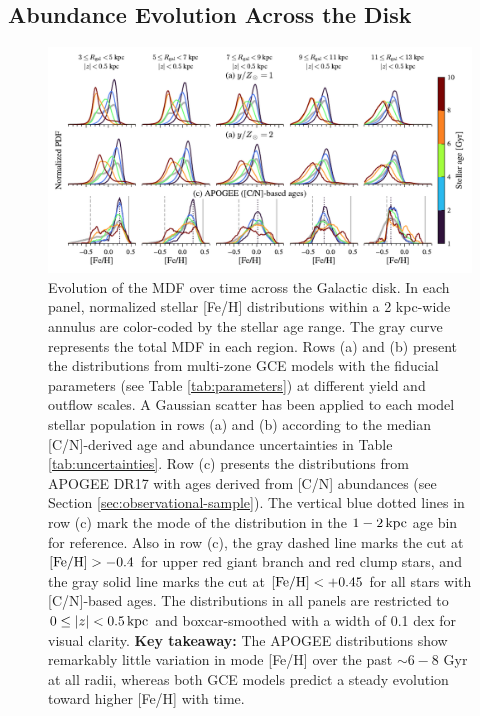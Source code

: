 \documentclass[twocolumn,twocolappendix,linenumbers]{aastex631}
\newcommand{\mathFeH}{{\rm [Fe/H]}}
\newcommand{\kpc}{\,{\rm kpc}}
\begin{document}
\subsection{Abundance Evolution Across the Disk}
\label{sec:disk-evolution}

\begin{figure}
    \centering
    \includegraphics[width=\textwidth]{figures/mdf_evolution.pdf}
    \caption{Evolution of the MDF over time across the Galactic disk. In each panel, normalized stellar [Fe/H] distributions within a {2 kpc}-wide annulus are color-coded by the stellar age range. The gray curve represents the total MDF in each region. Rows (a) and (b) present the distributions from multi-zone GCE models with the fiducial parameters (see Table \ref{tab:parameters}) at different yield and outflow scales. 
    A Gaussian scatter has been applied to each model stellar population in rows (a) and (b) according to the median [C/N]-derived age and abundance uncertainties in Table \ref{tab:uncertainties}. Row (c) presents the distributions from APOGEE DR17 with ages derived from [C/N] abundances (see Section \ref{sec:observational-sample}). The vertical blue dotted lines in row (c) mark the mode of the distribution in the $1-2\kpc$ age bin for reference. Also in row (c), the gray dashed line marks the cut at $\mathFeH>-0.4$ for upper red giant branch and red clump stars, and the gray solid line marks the cut at $\mathFeH<+0.45$ for all stars with [C/N]-based ages. The distributions in all panels are restricted to $0\leq|z|<0.5\kpc$ and boxcar-smoothed with a width of {0.1 dex} for visual clarity. {\bf Key takeaway:} The APOGEE distributions show remarkably little variation in mode [Fe/H] over the past $\sim6-8$ Gyr at all radii, whereas both GCE models predict a steady evolution toward higher [Fe/H] with time.}
    \label{fig:mdf-evolution}
\end{figure}
\end{document}

